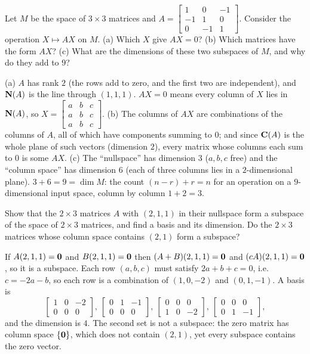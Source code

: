 \begin{exercise}\label{exr:u12-AX}
Let $M$ be the space of $3\times3$ matrices and $A=\begin{bmatrix}1&0&-1\\-1&1&0\\0&-1&1\end{bmatrix}$.
Consider the operation $X\mapsto AX$ on $M$. (a) Which $X$ give $AX=0$? (b) Which matrices have
the form $AX$? (c) What are the dimensions of these two subspaces of $M$, and why do they add to $9$?
\end{exercise}
\begin{solution}
(a) $A$ has rank $2$ (the rows add to zero, and the first two are independent), and
$\mathbf{N}(A)$ is the line through $(1,1,1)$. $AX=0$ means every column of $X$ lies in $\mathbf{N}(A)$, so
$X=\begin{bmatrix}a&b&c\\a&b&c\\a&b&c\end{bmatrix}$. (b) The columns of $AX$ are combinations of the
columns of $A$, all of which have components summing to $0$; and since $\mathbf{C}(A)$ is the whole
plane of such vectors (dimension $2$), every matrix whose columns each sum to $0$ is some $AX$.
(c) The ``nullspace'' has dimension $3$ ($a,b,c$ free) and the ``column space'' has dimension $6$
(each of three columns lies in a $2$-dimensional plane). $3+6=9=\dim M$: the count
$(n-r)+r=n$ for an operation on a $9$-dimensional input space, column by column $1+2=3$.
\end{solution}

\begin{exercise}\label{exr:u12-211}
Show that the $2\times3$ matrices $A$ with $(2,1,1)$ in their nullspace form a subspace of the
space of $2\times3$ matrices, and find a basis and its dimension. Do the $2\times3$ matrices whose
column space contains $(2,1)$ form a subspace?
\end{exercise}
\begin{solution}
If $A(2,1,1)=\boldsymbol{0}$ and $B(2,1,1)=\boldsymbol{0}$ then $(A+B)(2,1,1)=\boldsymbol{0}$ and $(cA)(2,1,1)=\boldsymbol{0}$, so it
is a subspace. Each row $(a,b,c)$ must satisfy $2a+b+c=0$, i.e.\ $c=-2a-b$, so each row is a
combination of $(1,0,-2)$ and $(0,1,-1)$. A basis is
\[
\begin{bmatrix}1&0&-2\\0&0&0\end{bmatrix},\
\begin{bmatrix}0&1&-1\\0&0&0\end{bmatrix},\
\begin{bmatrix}0&0&0\\1&0&-2\end{bmatrix},\
\begin{bmatrix}0&0&0\\0&1&-1\end{bmatrix},
\]
and the dimension is $4$. The second set is not a subspace: the zero matrix has column space
$\{\boldsymbol{0}\}$, which does not contain $(2,1)$, yet every subspace contains the zero vector.
\end{solution}


